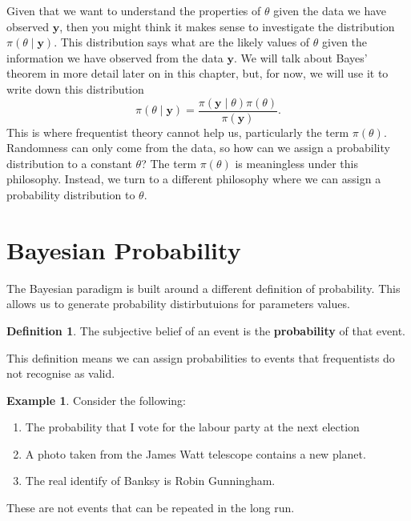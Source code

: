 \documentclass[
]{book}
\theoremstyle{definition}
\newtheorem{definition}{Definition}[chapter]
\theoremstyle{definition}
\newtheorem{example}{Example}[chapter]
\theoremstyle{definition}
\theoremstyle{definition}
\theoremstyle{remark}
\begin{document}
Given that we want to understand the properties of \(\theta\) given the data we have observed \(\boldsymbol{y}\), then you might think it makes sense to investigate the distribution \(\pi(\theta \mid \boldsymbol{y})\). This distribution says what are the likely values of \(\theta\) given the information we have observed from the data \(\boldsymbol{y}\). We will talk about Bayes' theorem in more detail later on in this chapter, but, for now, we will use it to write down this distribution
\[
\pi(\theta \mid \boldsymbol{y}) = \frac{\pi(\boldsymbol{y} \mid \theta)\pi(\theta)}{\pi(\boldsymbol{y})}. 
\]
This is where frequentist theory cannot help us, particularly the term \(\pi(\theta)\). Randomness can only come from the data, so how can we assign a probability distribution to a constant \(\theta\)? The term \(\pi(\theta)\) is meaningless under this philosophy. Instead, we turn to a different philosophy where we can assign a probability distribution to \(\theta\).

\hypertarget{bayesian-probability}{%
\section{Bayesian Probability}\label{bayesian-probability}}

The Bayesian paradigm is built around a different definition of probability. This allows us to generate probability distirbutuions for parameters values.

\begin{definition}
The subjective belief of an event is the \textbf{probability} of that event.
\end{definition}

This definition means we can assign probabilities to events that frequentists do not recognise as valid.

\begin{example}
Consider the following:

\begin{enumerate}
\def\labelenumi{\arabic{enumi}.}
\item
  The probability that I vote for the labour party at the next election
\item
  A photo taken from the James Watt telescope contains a new planet.
\item
  The real identify of Banksy is Robin Gunningham.
\end{enumerate}

These are not events that can be repeated in the long run.
\end{example}
\end{document}
